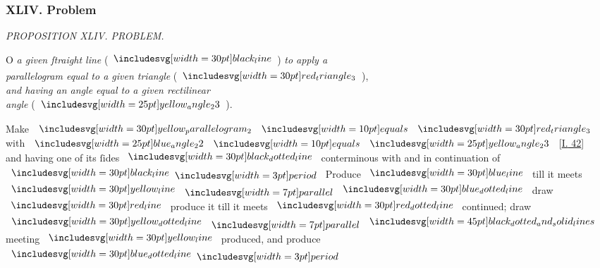 \documentclass[12pt,preview]{standalone}
\begin{document}
\subsubsection{XLIV. Problem}

\begin{minipage}[t]{0.64\textwidth}
    \vspace{0pt}

    \begin{center}
        \textit{PROPOSITION XLIV. PROBLEM.}\label{book1pr44} \\
    \end{center}

    \hfill

    \begin{center}
        \raggedright \lettrine[lines=4, loversize=1, nindent=0pt]{}{}O \textit{a given ſtraight line} (\hspace{-1ex}$\blackline$\hspace{-1ex}) \textit{to apply a\\ parallelogram equal to a given triangle} (\hspace{-1ex}$\img[0][0][30]{red_triangle_3}$\hspace{-1ex}),\\ \textit{and having an angle equal to a given rectilinear\\ angle} (\hspace{-1ex}$\img{yellow_angle_23}$\hspace{-1ex}).
    \end{center}

    \hfill

    \hfill

    {\vspace{1ex}\begin{center}
            Make $\img[0][0][30]{yellow_parallelogram_2} \bequals \img[0][0][30]{red_triangle_3}$ with $\img{blue_angle_22} \bequals \img{yellow_angle_23}$ [\hyperref[book1pr42]{\textsc{I.} 42}]\\
            and having one of its ſides $\dottedblackline$ conterminous with and in continuation of $\blackline \bperiod$ Produce $\blueline$ till it meets $\yellowline \bparallel \dottedblueline$ draw $\redline$ produce it till it meets $\dottedredline$ continued; draw $\dottedyellowline \bparallel \bimg{black_dotted_and_solid_lines}$ meeting $\yellowline$ produced, and produce $\dottedblueline \bperiod$
        \end{center}}


\end{minipage}
\end{document}
